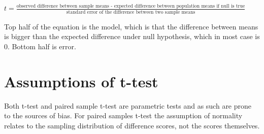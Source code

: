 \begin{center}
$t = \frac{\text{observed difference between sample means - expected difference between population means if null is true}}{\text{standard error of the difference between two sample means}}$
\end{center}

Top half of the equation is the model, which is that the difference between means is bigger than the expected difference under null hypothesis, which in most case is 0. Bottom half is error.

\section{Assumptions of t-test}
Both t-test and paired sample t-test are parametric tests and as such are prone to the sources of bias. For paired samples t-test the assumption of normality relates to the sampling distribution of difference scores, not the scores themselves.